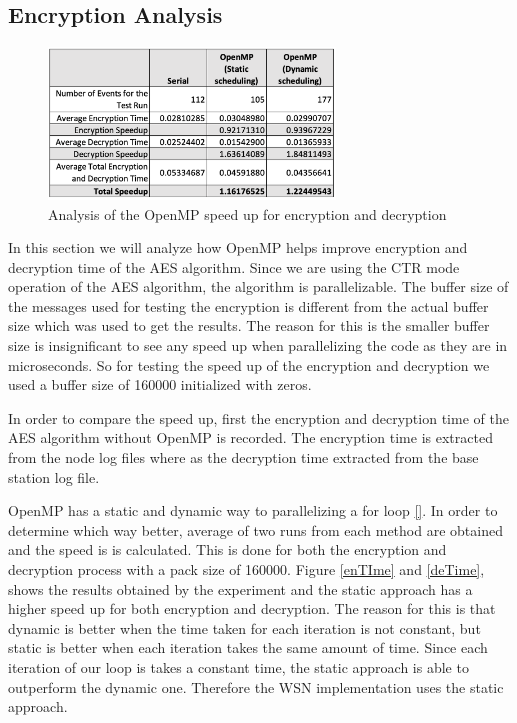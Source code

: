 \documentclass[conference]{IEEEtran}
\begin{document}
	\subsection{Encryption Analysis}	\label{encry}
	
		
	 \begin{figure}[!h]
	\centering
	\includegraphics[width=3in,keepaspectratio]{speed}
	\caption{Analysis of the OpenMP speed up for encryption and decryption}
	\label{speedup}
	\end{figure}
	
	In this section we will analyze how OpenMP helps improve encryption and decryption time of the AES algorithm. Since we are using the CTR mode operation of the AES algorithm, the algorithm is parallelizable. 	The buffer size of the messages used for testing the encryption is different from the actual buffer size which was used to get the results. The reason for this is the smaller buffer size is insignificant to see any speed up when parallelizing the code as they are in microseconds. So for testing the speed up of the encryption and decryption we used a buffer size of 160000 initialized with zeros.
	
	In order to compare the speed up, first the encryption and decryption time of the AES algorithm without OpenMP is recorded. The encryption time is extracted from the node log files where as the decryption time extracted from the base station log file. 
	
	OpenMP has a static and dynamic way to parallelizing a for loop \ref{}. In order to determine which way better, average of two runs from each method are obtained and the speed is is calculated. This is done for both the encryption and decryption process with a pack size of 160000. Figure \ref{enTIme} and \ref{deTime}, shows the results obtained by the experiment and the static approach has a higher speed up for both encryption and decryption. The reason for this is that dynamic is better when the time taken for each iteration is not constant, but static is better when each iteration takes the same amount of time. Since each iteration of our loop is takes a constant time, the static approach is able to outperform the dynamic one. Therefore the WSN implementation uses the static approach.
\end{document}
